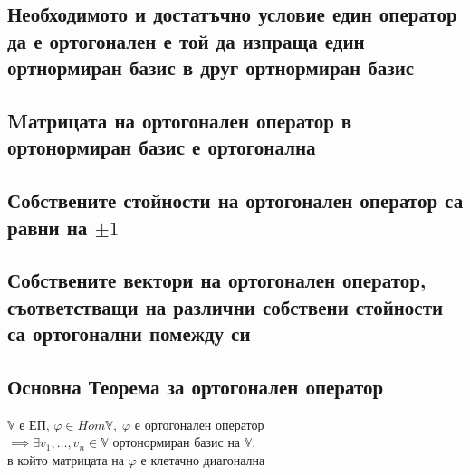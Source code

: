 \documentclass{article}
\newcommand{\V}{\mathbb{V}}
\newcommand{\n}[1]{#1_1, \dots, #1_n}
\begin{document}
    \subsection{Необходимото и достатъчно условие един оператор да е ортогонален е той да изпраща един ортнормиран базис в друг ортнормиран базис}
    \subsection{Mатрицата на ортогонален оператор в ортонормиран базис е ортогонална}
    \subsection{Собствените стойности на ортогонален оператор са равни на \(\pm 1\)}
    \subsection{Собствените вектори на ортогонален оператор, съответстващи на различни собствени стойности са ортогонални помежду си}
    \subsection{Основна Теорема за ортогонален оператор}
    \(\V\) е ЕП, \(\varphi \in Hom\V, \; \varphi\) е ортогонален оператор\\
    \(\implies \exists \n{v} \in \V\) ортонормиран базис на \(\V\),\\
    в който матрицата на \(\varphi\) е клетачно диагонална
\end{document}
